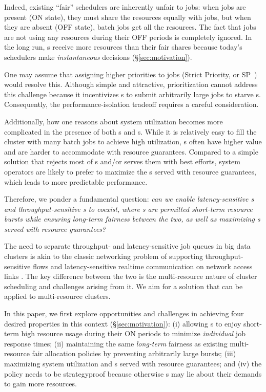 Indeed, existing ``fair'' schedulers are inherently unfair to \burstq jobs: when \burstq jobs are present (ON state), they must share the resources equally with \batchq jobs, but when they are absent (OFF state), batch jobs get all the resources. 
The fact that \burstq jobs are not using any resources during their OFF periods is completely ignored.
In the long run, {\batchq}s receive more resources than their fair shares because today's schedulers make \emph{instantaneous} decisions (\S\ref{sec:motivation}).

One may assume that assigning higher priorities to {\burstq} jobs (Strict Priority, or SP~\cite{strict_priority}) would resolve this. 
Although simple and attractive, prioritization cannot address this challenge because it incentivizes {\burstq}s to submit arbitrarily large jobs to starve {\batchq}s. 
Consequently, the performance-isolation tradeoff requires a careful consideration. 

Additionally, how one reasons about system utilization becomes more complicated in the presence of both {\burstq}s and {\batchq}s. 
While it is relatively easy to fill the cluster with many batch jobs to achieve high utilization, {\burstq}s often have higher value and are harder to accommodate with resource guarantees. 
Compared to a simple solution that rejects most of {\burstq}s and/or serves them with best efforts, system operators are likely to prefer to maximize the {\burstq}s served with resource guarantees, which leads to more predictable performance. %

Therefore, we ponder a fundamental question: \emph{can we enable latency-sensitive {\burstq}s and throughput-sensitive {\batchq}s to coexist, where {\burstq}s are permitted short-term resource bursts while ensuring long-term fairness between the two, as well as maximizing {\burstq}s served with resource guarantees?}

The need to separate throughput- and latency-sensitive job queues in big data clusters is akin to the classic networking problem of supporting throughput-sensitive flows and latency-sensitive realtime communication on network access links \cite{cbq, intserv-hierarchy, hfsc, cruz-sc}.
The key difference between the two is the multi-resource nature of cluster scheduling and challenges arising from it. 
We aim for a solution that can be applied to multi-resource clusters.

In this paper, we first explore opportunities and challenges in achieving four desired properties in this context (\S\ref{sec:motivation}): (i) allowing {\burstq}s to enjoy short-term high resource usage during their ON periods to minimize \emph{individual} job response times; (ii) maintaining the same \emph{long-term} fairness as existing multi-resource fair allocation policies by preventing arbitrarily large bursts; (iii) maximizing system utilization and {\burstq}s served with resource guarantees; %
and (iv) the policy needs to be strategyproof because otherwise {\burstq}s may lie about their demands to gain more resources. 

